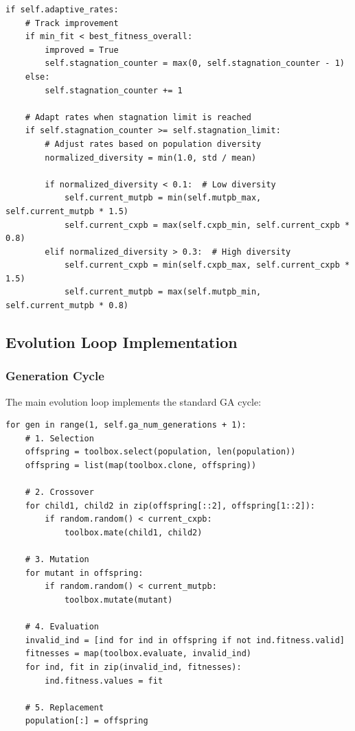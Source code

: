 \documentclass[12pt,a4paper]{article}
\begin{document}
\begin{lstlisting}[caption=Adaptive Rate Logic]
if self.adaptive_rates:
    # Track improvement
    if min_fit < best_fitness_overall:
        improved = True
        self.stagnation_counter = max(0, self.stagnation_counter - 1)
    else:
        self.stagnation_counter += 1
    
    # Adapt rates when stagnation limit is reached
    if self.stagnation_counter >= self.stagnation_limit:
        # Adjust rates based on population diversity
        normalized_diversity = min(1.0, std / mean)
        
        if normalized_diversity < 0.1:  # Low diversity
            self.current_mutpb = min(self.mutpb_max, self.current_mutpb * 1.5)
            self.current_cxpb = max(self.cxpb_min, self.current_cxpb * 0.8)
        elif normalized_diversity > 0.3:  # High diversity
            self.current_cxpb = min(self.cxpb_max, self.current_cxpb * 1.5)
            self.current_mutpb = max(self.mutpb_min, self.current_mutpb * 0.8)
\end{lstlisting}

\subsection{Evolution Loop Implementation}

\subsubsection{Generation Cycle}
The main evolution loop implements the standard GA cycle:

\begin{lstlisting}[caption=Evolution Loop Structure]
for gen in range(1, self.ga_num_generations + 1):
    # 1. Selection
    offspring = toolbox.select(population, len(population))
    offspring = list(map(toolbox.clone, offspring))
    
    # 2. Crossover
    for child1, child2 in zip(offspring[::2], offspring[1::2]):
        if random.random() < current_cxpb:
            toolbox.mate(child1, child2)
    
    # 3. Mutation
    for mutant in offspring:
        if random.random() < current_mutpb:
            toolbox.mutate(mutant)
    
    # 4. Evaluation
    invalid_ind = [ind for ind in offspring if not ind.fitness.valid]
    fitnesses = map(toolbox.evaluate, invalid_ind)
    for ind, fit in zip(invalid_ind, fitnesses):
        ind.fitness.values = fit
    
    # 5. Replacement
    population[:] = offspring
\end{lstlisting}
\end{document}
